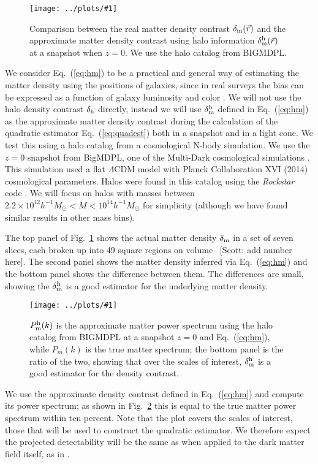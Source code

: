 \documentclass[prd,amsmath,amssymb,floatfix,superscriptaddress,nofootinbib,twocolumn]{revtex4-1}
\newcommand{\vrr}{\vec{r}}
\newcommand{\ec}[1]{Eq.~(\ref{eq:#1})}
\newcommand{\rf}[1]{\ref{fig:#1}}
\newcommand{\sfig}[2]{
\texttt{[image: ../plots/\#1]}
        }
\newcommand{\Sfig}[2]{
   \begin{figure}[thbp]
   \begin{center}
    \sfig{../plots/#1.pdf}{\columnwidth}
    \caption{{\small #2}}
    \label{fig:#1}
     \end{center}
   \end{figure}
}
\newcommand{\scott}[1]{{\color{darkgreen} \, [Scott: #1]}}
\newcommand\dmh{\delta_{\rm m}^{\rm h}}
\begin{document}
\Sfig{real_comp}{Comparison between the real matter density contrast $\delta_{\rm m}(\vrr)$ and the approximate matter density contrast using halo information $\dmh(\vrr)$ at a snapshot when $z=0$. We use the halo catalog from BIGMDPL.}

We consider \ec{hm} to be a practical and general way of estimating the matter density using the positions of galaxies, since in real surveys the bias can be expressed as a function of galaxy luminosity and color \cite{Cresswell:2008Col}. We will not use the halo density contrast $\delta_{\rm h}$ directly, instead we will use $\dmh$ defined in \ec{hm} as the approximate matter density contrast during the calculation of the quadratic estimator \ec{quadest} both in a snapshot and in a light cone.
We test this using a halo catalog from a cosmological N-body simulation. We use the $z=0$ snapshot from BigMDPL, one of the Multi-Dark cosmological simulations \cite{Klypin:2014nov}. This simulation used a flat $\Lambda$CDM model with Planck Collaboration XVI (2014) \cite{Planck:2014cos} cosmological parameters. Halos were found in this catalog using the \textit{Rockstar} code \cite{Behroozi:2013Rock}. We will focus on halos with masses between $2.2 \times 10^{12}h^{-1}M_{\odot}<M < 10^{14}h^{-1}M_{\odot}$ for simplicity (although we have found similar results in other mass bins).

The top panel of Fig.~\rf{real_comp} shows the actual matter density $\delta_{\rm m}$ in a set of seven slices, each broken up into 49 square regions on volume \scott{add number here}. The second panel shows the matter density inferred via \ec{hm} and the bottom panel shows the difference between them. The differences are small, showing the $\dmh$ is a good estimator for the underlying matter density.

\Sfig{hm}{$P_{\rm m}^{\rm h}(k)$ is the approximate matter power spectrum using the halo catalog from BIGMDPL at a snapshot $z=0$ and \ec{hm}, while $P_m(k)$ is the true matter spectrum; the bottom panel is the ratio of the two, showing that over the scales of interest, $\dmh$ is a good estimator for the density contrast.}

We use the approximate density contrast defined in \ec{hm} and compute its power spectrum; as shown in Fig.~\rf{hm} this is equal to the true matter power spectrum within ten percent. Note that the plot covers the scales of interest, those that will be used to construct the quadratic estimator.
We therefore expect the projected detectability will be the same as when applied to the dark matter field itself, as in  \cite{Li:2020fir}. 
\end{document}
